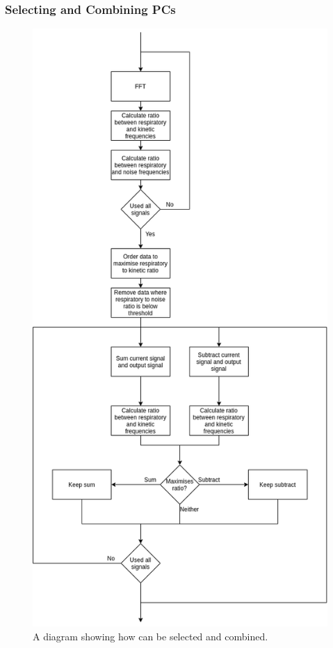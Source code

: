                 \subsubsection{Selecting and Combining PCs} \label{sec:pca_data_driven_surrogate_signal_extraction_methods_for_dynamic_pet_methods_selecting_and_combining_pcs}
                    \begin{figure}
                        \centering
                        
                        \includegraphics[width=0.7\linewidth]{figures/data_driven_surrogate_signal_extraction_methods_1_select_and_combine.png}
                        
                        \captionsetup{singlelinecheck=false, justification=centering}
                        \caption{A diagram showing how  can be selected and combined.}
                        \label{fig:pca_data_driven_surrogate_signal_extraction_methods_for_dynamic_pet_methods_select_and_combine}
                    \end{figure}
                
